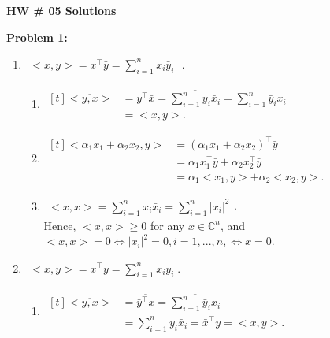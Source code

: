 \documentclass[letterpaper]{article}
\begin{document}
\newcommand{\trace}{\mathrm{trace}}
\newcommand{\real}{\mathbb R}  %
\newcommand{\nat}{\mathbb R}   %
\newcommand{\cp}{\mathbb C}    %
\newcommand{\ds}{\displaystyle}
\newcommand{\mf}[2]{\frac{\ds #1}{\ds #2}}
\newcommand{\book}[2]{{Luenberger, Page~#1, }{Prob.~#2}}
\newcommand{\spanof}[1]{\textrm{span} \{ #1 \}}
\parindent 0pt


\begin{center}
{\large \bf HW \# 05 Solutions}
\end{center}

\vspace*{1cm}

\noindent \textbf{Problem  1:}
\begin{enumerate}
\setlength{\itemsep}{.1in}
\renewcommand{\labelenumi}{(\alph{enumi})}
\item $\begin{aligned}<x,y> = x^\top \bar{y} = \sum_{i=1}^{n} x_i \bar{y}_i \end{aligned}\;$.
\begin{enumerate}
\setlength{\itemsep}{.1in}
\renewcommand{\labelenumii}{(\roman{enumii})}
\item $\begin{aligned}[t] \overline{<y, x>} &= \overline{y^\top \bar{x}}=\overline{\sum_{i=1}^{n}y_i \bar{x}_i} = \sum_{i=1}^{n}\bar{y}_ix_i \\ & = <x,y>. \end{aligned}$

\item $\begin{aligned}[t] <\alpha_1 x_1+\alpha_2 x_2, y> & =(\alpha_1 x_1+\alpha_2 x_2)^\top \bar{y} \\&=\alpha_1x_1^\top\bar{y}+\alpha_2 x_2^\top\bar{y} \\ &=\alpha_1<x_1,y>+\alpha_2<x_2,y>.\end{aligned} $

\item $\begin{aligned}<x,x>=\sum_{i=1}^n x_i \bar{x}_i=\sum_{i=1}^n |x_i|^2\end{aligned}$.
\smallskip \\
Hence, $<x, x> \geq 0$ for any $x\in \cp^n$, and $<x, x> = 0 \iff |x_i|^2=0, i = 1, ..., n, \iff x=0$.
\end{enumerate}

\item $\begin{aligned} <x,y> = \bar{x}^\top y = \sum_{i=1}^{n}\bar{x}_i y_i\; .\end{aligned}$
\begin{enumerate}
\setlength{\itemsep}{.1in}
\renewcommand{\labelenumii}{(\roman{enumii})}
\item $\begin{aligned}[t]\overline{<y,x>} &= \overline{\bar{y}^\top x}=\overline{\sum_{i=1}^n \bar{y}_i x_i} \\
&=\sum_{i=1}^n y_i \bar{x}_i = \bar{x}^\top y = <x,y>.\end{aligned}$


\end{enumerate}
\end{enumerate}
\end{document}
